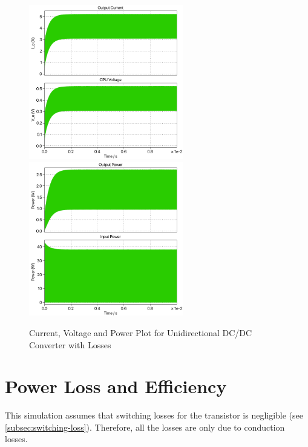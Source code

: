 \documentclass{article}
\begin{document}
\begin{figure}[H]
    \centering{}
    \includegraphics[width=0.6\textwidth]{img/loss-I-V-unidirectional.pdf}
    \includegraphics[width=0.6\textwidth]{img/loss-power-unidirectional.pdf}
    \label{fig:loss-uni-plots}
    \caption{Current, Voltage and Power Plot for Unidirectional DC/DC Converter with Losses}
\end{figure}

\section{Power Loss and Efficiency}

This simulation assumes that switching losses for the transistor is negligible (see \ref{subsec:switching-loss}).
Therefore, all the losses are only due to conduction losses.
\end{document}
